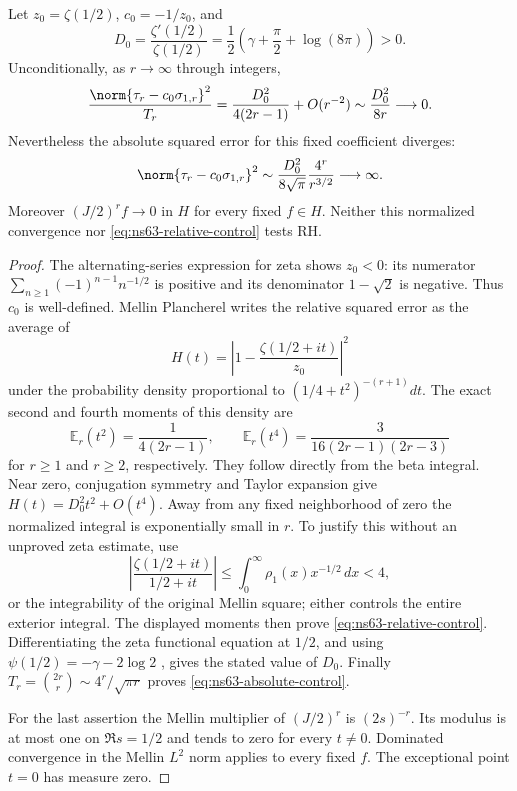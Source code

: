 \begin{proposition}
\label{prop:ns63-one-atom}
Let $z_0=\zeta(1/2)$, $c_0=-1/z_0$, and
\[
 D_0=\frac{\zeta'(1/2)}{\zeta(1/2)}
     =\frac12\left(\gamma+\frac\pi2+\log(8\pi)\right)>0.
\]
Unconditionally, as $r\to\infty$ through integers,
\begin{equation}
 \frac{\norm{\tau_r-c_0\sigma_{1,r}}^2}{T_r}
    =\frac{D_0^2}{4(2r-1)}+O(r^{-2})
    \sim\frac{D_0^2}{8r}\longrightarrow0.
 \label{eq:ns63-relative-control}
\end{equation}
Nevertheless the absolute squared error for this fixed coefficient
diverges:
\begin{equation}
 \norm{\tau_r-c_0\sigma_{1,r}}^2
      \sim\frac{D_0^2}{8\sqrt\pi}\frac{4^r}{r^{3/2}}
      \longrightarrow\infty.
 \label{eq:ns63-absolute-control}
\end{equation}
Moreover $(J/2)^rf\to0$ in $H$ for every fixed $f\in H$.
Neither this normalized convergence nor
\eqref{eq:ns63-relative-control} tests RH.
\end{proposition}
\begin{proof}
The alternating-series expression for zeta shows $z_0<0$: its
numerator $\sum_{n\geq1}(-1)^{n-1}n^{-1/2}$ is positive and its
denominator $1-\sqrt2$ is negative. Thus $c_0$ is well-defined.
Mellin Plancherel writes the relative squared error as the average of
\[
 H(t)=\left|1-\frac{\zeta(1/2+it)}{z_0}\right|^2
\]
under the probability density proportional to
$(1/4+t^2)^{-(r+1)}dt$. The exact second and fourth moments of this
density are
\[
 \mathbb E_r(t^2)=\frac1{4(2r-1)},\qquad
 \mathbb E_r(t^4)=\frac3{16(2r-1)(2r-3)}
\]
for $r\geq1$ and $r\geq2$, respectively. They follow directly
from the beta integral. Near zero, conjugation symmetry and Taylor
expansion give $H(t)=D_0^2t^2+O(t^4)$.
Away from any fixed neighborhood of zero the normalized integral is
exponentially small in $r$. To justify this without an unproved zeta
estimate, use
\[
 \left|\frac{\zeta(1/2+it)}{1/2+it}\right|
 \leq\int_0^\infty\rho_1(x)x^{-1/2}\,dx<4,
\]
or the integrability of the original Mellin square; either controls
the entire exterior integral. The displayed moments then prove
\eqref{eq:ns63-relative-control}. Differentiating the zeta functional
equation at $1/2$, and using
$\psi(1/2)=-\gamma-2\log2$ \cite[Eq. (5.4.13)]{DLMFGammaBounds},
gives the stated value of $D_0$.
Finally $T_r=\binom{2r}{r}\sim4^r/\sqrt{\pi r}$ proves
\eqref{eq:ns63-absolute-control}.

For the last assertion the Mellin multiplier of $(J/2)^r$ is
$(2s)^{-r}$. Its modulus is at most one on $\Re s=1/2$ and tends
to zero for every $t\ne0$. Dominated convergence in the Mellin
$L^2$ norm applies to every fixed $f$. The exceptional point $t=0$
has measure zero.
\end{proof}


